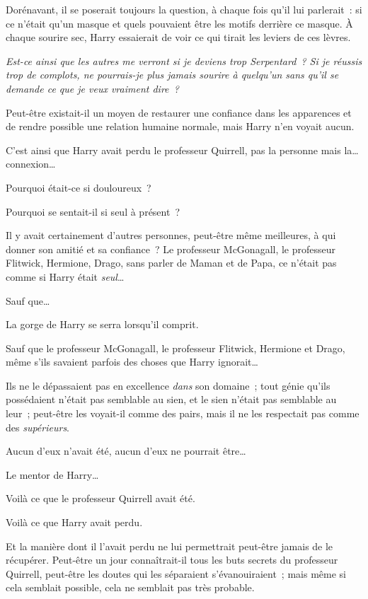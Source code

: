 Dorénavant, il se poserait toujours la question, à chaque fois qu'il lui parlerait~: si ce n'était qu'un masque et quels pouvaient être les motifs derrière ce masque.
À chaque sourire sec, Harry essaierait de voir ce qui tirait les leviers de ces lèvres.

\emph{Est-ce ainsi que les autres me verront si je deviens trop Serpentard~?
Si je réussis trop de complots, ne pourrais-je plus jamais sourire à quelqu'un sans qu'il se demande ce que je veux vraiment dire~?}

Peut-être existait-il un moyen de restaurer une confiance dans les apparences et de rendre possible une relation humaine normale, mais Harry n'en voyait aucun.

C'est ainsi que Harry avait perdu le professeur Quirrell, pas la personne mais la… connexion…

Pourquoi était-ce si douloureux~?

Pourquoi se sentait-il si seul à présent~?

Il y avait certainement d'autres personnes, peut-être même meilleures, à qui donner son amitié et sa confiance~?
Le professeur McGonagall, le professeur Flitwick, Hermione, Drago, sans parler de Maman et de Papa, ce n'était pas comme si Harry était \emph{seul}…

Sauf que…

La gorge de Harry se serra lorsqu'il comprit.

Sauf que le professeur McGonagall, le professeur Flitwick, Hermione et Drago, même s'ils savaient parfois des choses que Harry ignorait…

Ils ne le dépassaient pas en excellence \emph{dans} son domaine~; tout génie qu'ils possédaient n'était pas semblable au sien, et le sien n'était pas semblable au leur~; peut-être les voyait-il comme des pairs, mais il ne les respectait pas comme des \emph{supérieurs}.

Aucun d'eux n'avait été, aucun d'eux ne pourrait être…

Le mentor de Harry…

Voilà ce que le professeur Quirrell avait été.

Voilà ce que Harry avait perdu.

Et la manière dont il l'avait perdu ne lui permettrait peut-être jamais de le récupérer.
Peut-être un jour connaîtrait-il tous les buts secrets du professeur Quirrell, peut-être les doutes qui les séparaient s'évanouiraient~; mais même si cela semblait possible, cela ne semblait pas très probable.

